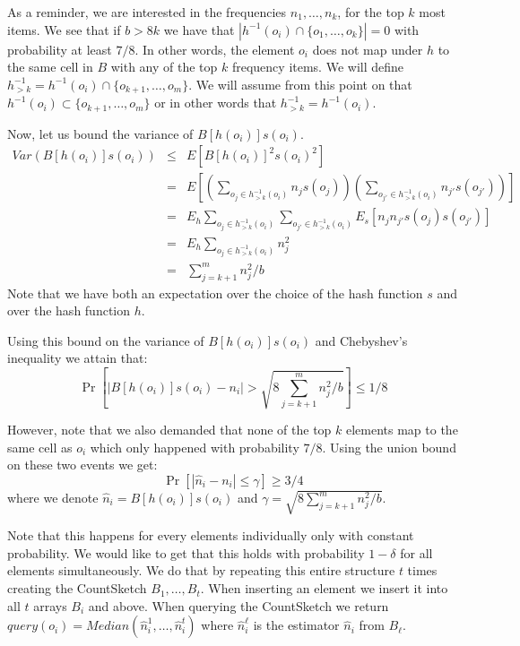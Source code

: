 \documentclass{article}
\begin{document}
As a reminder, we are interested in the frequencies $n_1,\ldots,n_k$, for the top $k$ most items.
We see that if $b > 8k$ we have that $|h^{-1}(o_i)\cap\{o_1,\ldots,o_k\} |=0$ with probability at least $7/8$.
In other words, the element $o_i$ does not map under $h$ to the same cell in $B$ with any of the top $k$ frequency items.
We will define $h^{-1}_{>k} = h^{-1}(o_i)\cap\{o_{k+1},\ldots,o_m\}$.
We will assume from this point on that $h^{-1}(o_i) \subset \{o_{k+1},\ldots,o_m\}$ or in other words that $h^{-1}_{>k} = h^{-1}(o_i)$.

Now, let us bound the variance of $B[h(o_i)]s(o_i)$.
\begin{eqnarray*}
Var(B[h(o_i)]s(o_i)) &\le & E[B[h(o_i)]^2 s(o_i)^2] \\
&=& E[(\sum_{o_j \in h^{-1}_{>k}(o_i)} n_j s(o_j))(\sum_{o_{j'} \in h^{-1}_{>k}(o_i)} n_{j'} s(o_{j'}))]\\
&= & E_h \sum_{o_j \in h^{-1}_{>k}(o_i)} \sum_{o_{j'} \in h^{-1}_{>k}(o_i)} E_s [n_j n_{j'} s(o_j) s(o_{j'}) ]\\
&= &E_h  \sum_{o_j \in h^{-1}_{>k}(o_i)}n^2_j \\
&= &\sum_{j = k+1}^{m}n^2_j / b
\end{eqnarray*}
Note that we have both an expectation over the choice of the hash function $s$ and over the hash function $h$.

Using this bound on the variance of $B[h(o_i)]s(o_i)$ and Chebyshev's inequality we attain that:
$$
\Pr\left[ \left| B[h(o_i)]s(o_i) - n_i \right| > \sqrt{8 \sum_{j = k+1}^{m}n^2_j / b} \right] \le 1/8
$$

However, note that we also demanded that none of the top $k$ elements map to the same cell as $o_i$
which only happened with probability $7/8$. Using the union bound on these two events we get:   
$$
\Pr\left[ \left| \hat{n}_i - n_i \right| \le \gamma \right] \ge 3/4
$$
where we denote $\hat{n}_i =  B[h(o_i)]s(o_i)$ and $\gamma = \sqrt{8 \sum_{j = k+1}^{m}n^2_j / b}$.

Note that this happens for every elements individually only with constant probability.
We would like to get that this holds with probability $1-\delta$ for all elements simultaneously.
We do that by repeating this entire structure $t$ times creating the CountSketch $B_1,\ldots,B_t$.
When inserting an element we insert it into all $t$ arrays $B_i$ and above. 
When querying the CountSketch we return $query(o_i) = Median(\hat{n}^1_i,\ldots,\hat{n}^t_i)$ where $\hat{n}^\ell_i$
is the estimator $\hat{n}_i$ from $B_\ell$. 
\end{document}
